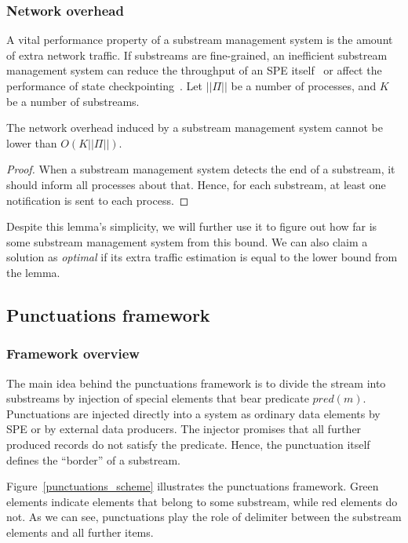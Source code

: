 \subsubsection{Network overhead}

A vital performance property of a substream management system is the amount of extra network traffic. If substreams are fine-grained, an inefficient substream management system can reduce the throughput of an SPE itself~\cite{Li:2008:OPN:1453856.1453890} or affect the performance of state checkpointing~\cite{zhang2021research}. Let $||\Pi||$ be a number of processes, and $K$ be a number of substreams. 

\begin{lemma}
The network overhead induced by a substream management system cannot be lower than $O(K||\Pi||)$. 
\end{lemma}
\begin{proof}
When a substream management system detects the end of a substream, it should inform all processes about that. Hence, for each substream, at least one notification is sent to each process.
\end{proof}

Despite this lemma's simplicity, we will further use it to figure out how far is some substream management system from this bound. We can also claim a solution as {\em optimal} if its extra traffic estimation is equal to the lower bound from the lemma.

\subsection{Punctuations framework}

\subsubsection{Framework overview}

The main idea behind the punctuations framework is to divide the stream into substreams by injection of special elements that bear predicate $pred(m)$. Punctuations are injected directly into a system as ordinary data elements by SPE or by external data producers. The injector promises that all further produced records do not satisfy the predicate. Hence, the punctuation itself defines the ``border'' of a substream.

Figure~\ref{punctuations_scheme} illustrates the punctuations framework. Green elements indicate elements that belong to some substream, while red elements do not. As we can see, punctuations play the role of delimiter between the substream elements and all further items.

